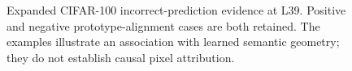\clearpage
\begin{landscape}
\begin{figure}[p]
    \centering
    \caption{Expanded CIFAR-100 incorrect-prediction evidence at L39.
    Positive and negative prototype-alignment cases are both retained. The
    examples illustrate an association with learned semantic geometry; they do
    not establish causal pixel attribution.}
    \label{fig:pca-cifar100-errors-appendix}
\end{figure}
\end{landscape}
\clearpage

